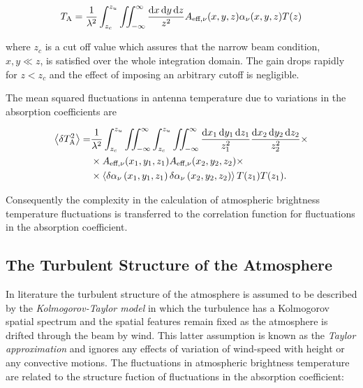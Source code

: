 \begin{equation}
        T_\text{A} = \frac{1}{\lambda^2} \int^{z_u}_{z_c}
        \iint^\infty_{-\infty} \frac{\dd{x}\dd{y}\dd{z}}{z^2}
        A_{\text{eff},\nu}\qty(x,y,z)
        \alpha_\nu\qty(x,y,z) T\qty(z)
        \label{eq:fluctuations_t_antenna}
\end{equation}

where $z_c$ is a cut off value which assures that the narrow beam
condition, $x,y \ll z$, is satisfied over the whole integration domain.
The gain drops rapidly for $z < z_c$ and the effect of imposing an
arbitrary cutoff is negligible.

The mean squared fluctuations in antenna temperature due to variations in
the absorption coefficients are

\begin{equation}
        \begin{split}
                \expval{\var{T^2_\text{A}}} = & \frac{1}{\lambda^2}
                \int^{z_u}_{z_c}\iint^\infty_{-\infty}
                \int^{z_u}_{z_c}\iint^\infty_{-\infty}
                \frac{\dd{x_1}\dd{y_1}\dd{z_1}}{z^2_1}
                \frac{\dd{x_2}\dd{y_2}\dd{z_2}}{z^2_2} \times \\
                & \times A_{\text{eff},\nu}\qty(x_1,y_1,z_1)
                A_{\text{eff},\nu}\qty(x_2,y_2,z_2) \times \\
                & \times \expval{\var{\alpha_\nu}\qty(x_1,y_1,z_1)
                \var{\alpha_\nu}\qty(x_2,y_2,z_2)}
                T\qty(z_1)T\qty(z_1).
        \end{split}
        \label{eq:rms_t_antenna}
\end{equation}

Consequently the complexity in the calculation of atmospheric brightness
temperature fluctuations is transferred to the correlation function for
fluctuations in the absorption coefficient.

\subsection{The Turbulent Structure of the Atmosphere}\label{ss:turbulent_structure}

In literature the turbulent structure of the atmosphere is assumed to be
described by the \emph{Kolmogorov-Taylor model} in which the turbulence has
a Kolmogorov spatial spectrum and the spatial features remain fixed as the
atmosphere is drifted through the beam by wind. This latter assumption is
known as the \emph{Taylor approximation} and ignores any effects of
variation of wind-speed with height or any convective motions.
The fluctuations in atmospheric brightness temperature are related to the
structure fuction of fluctuations in the absorption coefficient:


